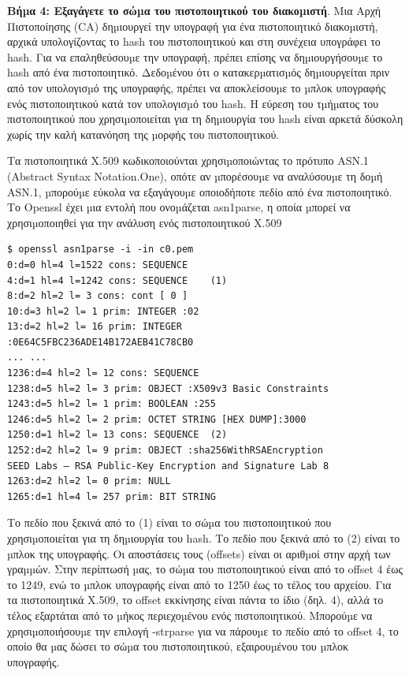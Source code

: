 \noindent
\textbf{Βήµα 4: Εξαγάγετε το σώµα του πιστοποιητικού του διακοµιστή}. Μια Αρχή Πιστοποίησης
(CA) δηµιουργεί την υπογραφή για ένα πιστοποιητικό διακοµιστή, αρχικά υπολογίζοντας το
hash του πιστοποιητικού και στη συνέχεια υπογράφει το hash. Για να επαληθεύσουµε την
υπογραφή, πρέπει επίσης να δηµιουργήσουµε το hash από ένα πιστοποιητικό. Δεδοµένου ότι ο
κατακερµατισµός δηµιουργείται πριν από τον υπολογισµό της υπογραφής, πρέπει να
αποκλείσουµε το µπλοκ υπογραφής ενός πιστοποιητικού κατά τον υπολογισµό του hash. Η
εύρεση του τµήµατος του πιστοποιητικού που χρησιµοποιείται για τη δηµιουργία του hash
είναι αρκετά δύσκολη χωρίς την καλή κατανόηση της µορφής του πιστοποιητικού.

\noindent
Τα πιστοποιητικά X.509 κωδικοποιούνται χρησιµοποιώντας το πρότυπο ASN.1 (Abstract Syntax
Notation.One), οπότε αν µπορέσουµε να αναλύσουµε τη δοµή ASN.1, µπορούµε εύκολα να
εξαγάγουµε οποιοδήποτε πεδίο από ένα πιστοποιητικό. Το Openssl έχει µια εντολή που
ονοµάζεται asn1parse, η οποία µπορεί να χρησιµοποιηθεί για την ανάλυση ενός
πιστοποιητικού X.509

\noindent
\begin{lstlisting}
$ openssl asn1parse -i -in c0.pem
0:d=0 hl=4 l=1522 cons: SEQUENCE
4:d=1 hl=4 l=1242 cons: SEQUENCE	(1)
8:d=2 hl=2 l= 3 cons: cont [ 0 ]
10:d=3 hl=2 l= 1 prim: INTEGER :02
13:d=2 hl=2 l= 16 prim: INTEGER
:0E64C5FBC236ADE14B172AEB41C78CB0
... ...
1236:d=4 hl=2 l= 12 cons: SEQUENCE
1238:d=5 hl=2 l= 3 prim: OBJECT :X509v3 Basic Constraints
1243:d=5 hl=2 l= 1 prim: BOOLEAN :255
1246:d=5 hl=2 l= 2 prim: OCTET STRING [HEX DUMP]:3000
1250:d=1 hl=2 l= 13 cons: SEQUENCE 	(2)
1252:d=2 hl=2 l= 9 prim: OBJECT :sha256WithRSAEncryption
SEED Labs – RSA Public-Key Encryption and Signature Lab 8
1263:d=2 hl=2 l= 0 prim: NULL
1265:d=1 hl=4 l= 257 prim: BIT STRING
\end{lstlisting}
\noindent
Το πεδίο που ξεκινά από το (1) είναι το σώµα του πιστοποιητικού που χρησιµοποιείται για τη
δηµιουργία του hash. Το πεδίο που ξεκινά από το (2) είναι το µπλοκ της υπογραφής. Οι
αποστάσεις τους (offsets) είναι οι αριθµοί στην αρχή των γραµµών. Στην περίπτωσή µας, το
σώµα του πιστοποιητικού είναι από το offset 4 έως το 1249, ενώ το µπλοκ υπογραφής είναι από
το 1250 έως το τέλος του αρχείου. Για τα πιστοποιητικά X.509, το offset εκκίνησης είναι πάντα το
ίδιο (δηλ. 4), αλλά το τέλος εξαρτάται από το µήκος περιεχοµένου ενός πιστοποιητικού.
Μπορούµε να χρησιµοποιήσουµε την επιλογή -strparse για να πάρουµε το πεδίο από το offset 4, 
το οποίο θα µας δώσει το σώµα του πιστοποιητικού, εξαιρουµένου του µπλοκ υπογραφής.

